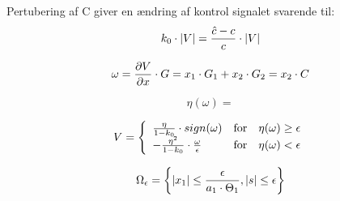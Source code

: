 Pertubering af C giver en ændring af kontrol signalet svarende til: 
\begin{equation}
	k_0 \cdot \vert V \vert = \frac{\hat{c} - c}{c} \cdot \vert V \vert
\end{equation}

\begin{equation}
	\omega = \frac{\partial V}{\partial x} \cdot G = x_1 \cdot G_1 + x_2 \cdot G_2 = x_2 \cdot C
\end{equation}

\begin{equation}
	\eta(\omega) = 
\end{equation}

\begin{equation} \label{eq:obstacle_avoidance}
  V = \left\{
  \begin{array}{l l}
    \frac{\eta}{1-k_0} \cdot sign(\omega) &  \text{for} \quad \eta(\omega)	\geq \epsilon \\
    -\frac{\eta ^2}{1-k_0} \cdot \frac{\omega}{\epsilon} & \text{for} \quad \eta(\omega) < \epsilon
  \end{array} \right.
\end{equation}

\begin{equation}
	\Omega_{\epsilon} = \left \{ \vert x_1 \vert \leq \frac{\epsilon}{a_1 \cdot \Theta_1}, \vert s \vert \leq \epsilon \right \}
\end{equation}